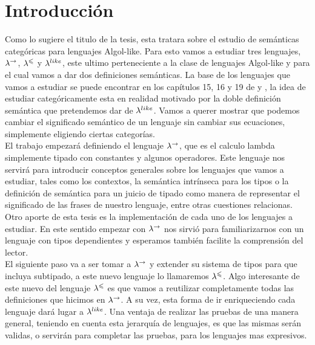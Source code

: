 \chapter{Introducci\'on}
\label{chap:intro}

Como lo sugiere el titulo de la tesis, esta tratara sobre el estudio
de sem\'anticas categ\'oricas para lenguajes Algol-like. Para esto
vamos a estudiar tres lenguajes, $\lambda^{\rightarrow}$, $\lambda^{\leqslant}$ y $\lambda^{like}$,
este ultimo perteneciente a la clase de lenguajes Algol-like y para el cual
vamos a dar dos definiciones sem\'anticas.
La base de los lenguajes que vamos a estudiar se puede encontrar en los
cap\'itulos 15, 16 y 19 de \cite{reynolds2009theories} y \cite{olesfunctorcategories}, 
la idea de estudiar
categ\'oricamente esta en realidad motivado por la doble definici\'on
sem\'antica que pretendemos dar de $\lambda^{like}$. Vamos a querer mostrar
que podemos cambiar el significado
sem\'antico de un lenguaje sin cambiar sus ecuaciones, simplemente
eligiendo ciertas categor\'ias.\\

El trabajo empezar\'a definiendo el lenguaje $\lambda^{\rightarrow}$, que es el
calculo lambda simplemente tipado con constantes y algunos operadores.
Este lenguaje nos servir\'a para introducir conceptos generales sobre 
los lenguajes que vamos a estudiar, tales como
los contextos, la sem\'antica intr\'inseca para los tipos o la definici\'on
de sem\'antica para un juicio de tipado como manera de representar el significado
de las frases de nuestro lenguaje, entre otras cuestiones relacionas. 
Otro aporte de esta tesis es la implementaci\'on de cada uno de los lenguajes
a estudiar. En este sentido empezar con $\lambda^{\rightarrow}$ nos sirvi\'o para
familiarizarnos con un lenguaje con tipos dependientes y esperamos tambi\'en
facilite la comprensi\'on del lector.\\

El siguiente paso va a ser tomar a $\lambda^{\rightarrow}$ y extender su sistema de 
tipos para que incluya subtipado, a este nuevo lenguaje lo llamaremos
$\lambda^{\leqslant}$. Algo interesante de este nuevo del lenguaje $\lambda^{\leqslant}$
es que vamos a reutilizar completamente todas las definiciones que hicimos
en $\lambda^{\rightarrow}$. A su vez, esta forma de ir enriqueciendo cada lenguaje 
dar\'a lugar a $\lambda^{like}$. Una ventaja de realizar las pruebas de una manera 
general, teniendo en cuenta esta jerarqu\'ia de lenguajes, es que las mismas
ser\'an validas, o servir\'an para completar las pruebas, para los
lenguajes mas expresivos.\\

